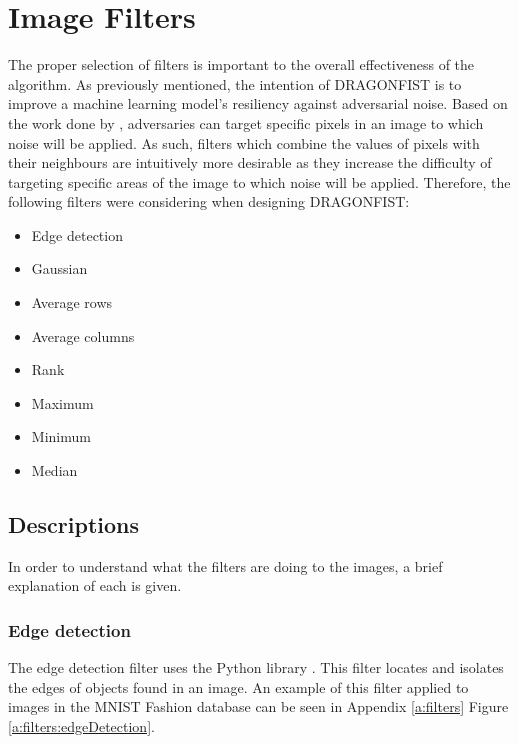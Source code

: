 \section{Image Filters} \label{s:filters}
	The proper selection of filters is important to the overall effectiveness of the algorithm. As previously mentioned, the intention of DRAGONFIST is to improve a machine learning model's resiliency against adversarial noise. Based on the work done by \citeauthor{goodfellow2015} \cite{goodfellow2015}, adversaries can target specific pixels in an image to which noise will be applied. As such, filters which combine the values of pixels with their neighbours are intuitively more desirable as they increase the difficulty of targeting specific areas of the image to which noise will be applied. Therefore, the following filters were considering when designing DRAGONFIST:
	\begin{multicols}{2}
		\begin{itemize}
			\item Edge detection
			\item Gaussian
			\item Average rows
			\item Average columns
			\item Rank
			\item Maximum
			\item Minimum
			\item Median
		\end{itemize}
	\end{multicols}

	\subsection{Descriptions} \label{s:filters:descriptions}
		In order to understand what the filters are doing to the images, a brief explanation of each is given.

		\subsubsection{Edge detection} \label{s:filters:descriptions:edgeDetection}
			The edge detection filter uses the Python library  \cite{skikitImage}. This filter locates and isolates the edges of objects found in an image. An example of this filter applied to images in the MNIST Fashion database \cite{zalandoresearchFashionMNIST} can be seen in Appendix \ref{a:filters} Figure \ref{a:filters:edgeDetection}.

